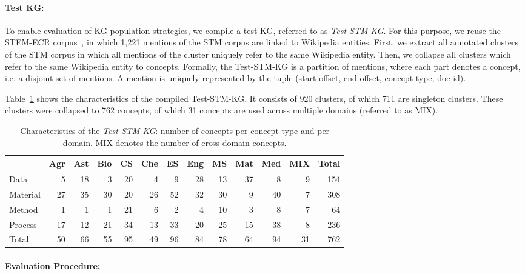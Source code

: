 \documentclass[runningheads]{llncs}
\begin{document}
\paragraph{Test KG:}
To enable evaluation of KG population strategies, we compile a test KG, referred to as \emph{Test-STM-KG}.
For this purpose, we reuse the STEM-ECR corpus~\cite{DSouza2020STEM}, in which 1,221 mentions of the STM corpus are linked to Wikipedia entities.
First, we extract all annotated clusters of the STM corpus in which all mentions of the cluster uniquely refer to the same Wikipedia entity. 
Then, we collapse all clusters which refer to the same Wikipedia entity to concepts.
Formally, the Test-STM-KG is a partition of mentions, where each part denotes a concept, i.e. a disjoint set of mentions. 
A mention is uniquely represented by the tuple (start offset, end offset, concept type, doc id).

Table~\ref{tab:test-stm-kg} shows the characteristics of the compiled Test-STM-KG.
It consists of 920 clusters, of which 711 are singleton clusters. These clusters were collapsed to 762 concepts,
of which 31 concepts are used across multiple domains (referred to as MIX).

\begin{table}[tb]
\centering
\small
\caption{Characteristics of the \emph{Test-STM-KG}: number of concepts per concept type and per domain. MIX denotes the number of cross-domain concepts.}
\label{tab:test-stm-kg}
\begin{tabular}{l|rrrrrrrrrrr|r}
         & Agr & Ast & Bio & CS & Che & ES & Eng & MS & Mat & Med & MIX & Total \\ \hline
Data     & 5   & 18  & 3   & 20 & 4   & 9  & 28  & 13 & 37  & 8   & 9  & 154   \\
Material & 27  & 35  & 30  & 20 & 26  & 52 & 32  & 30 & 9   & 40  & 7  & 308   \\
Method   & 1   & 1   & 1   & 21 & 6   & 2  & 4   & 10 & 3   & 8   & 7  & 64    \\
Process  & 17  & 12  & 21  & 34 & 13  & 33 & 20  & 25 & 15  & 38  & 8  & 236   \\ \hline
Total    & 50  & 66  & 55  & 95 & 49  & 96 & 84  & 78 & 64  & 94  & 31 & 762  
\end{tabular}
\end{table}

\paragraph{Evaluation Procedure:}
\label{sec:eval_procedure_kg_population}
\end{document}
